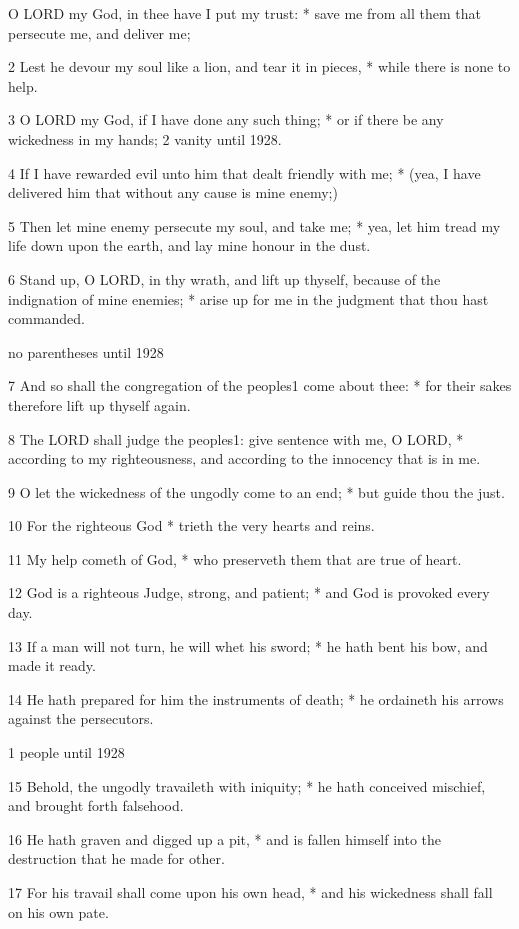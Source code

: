 O LORD my God, in thee have I put my trust:
* save me from all them that persecute me, and deliver me;

2 Lest he devour my soul like a lion, and tear it in
pieces, * while there is none to help.

3 O LORD my God, if I have done
any such thing; * or if there be any wickedness in my hands;
2 vanity until
1928.

4 If I have rewarded evil unto him that dealt friendly with
me; * (yea, I have delivered him that without any cause is mine enemy;)

5 Then let mine enemy persecute my soul, and take me; * yea,
let him tread my life down upon the earth, and lay mine honour in the dust.

6 Stand up, O LORD, in thy wrath, and
lift up thyself, because of the indignation of mine enemies; * arise up
for me in the judgment that thou hast commanded.

no
parentheses until 1928

7 And so shall the congregation of the peoples1 come about
thee: * for their sakes therefore lift up thyself again.

8 The LORD shall judge the peoples1:
give sentence with me, O LORD, * according to my
righteousness, and according to the innocency that is in me.

9 O let the wickedness of the ungodly come to an end;
* but guide thou the just.

10 For the righteous God * trieth the very hearts and
reins.

11 My help cometh of God, * who preserveth them that
are true of heart.

12 God is a righteous Judge, strong, and patient; * and
God is provoked every day.

13 If a man will not turn, he will whet his sword; *
he hath bent his bow, and made it ready.

14 He hath prepared for him the instruments of death;
* he ordaineth his arrows against the persecutors.

1 people
until 1928

15 Behold, the ungodly travaileth with iniquity; * he hath conceived
mischief, and brought forth falsehood.

16 He hath graven and digged up a pit, * and is fallen
himself into the destruction that he made for other.

17 For his travail shall come upon his own head, * and
his wickedness shall fall on his own pate.

